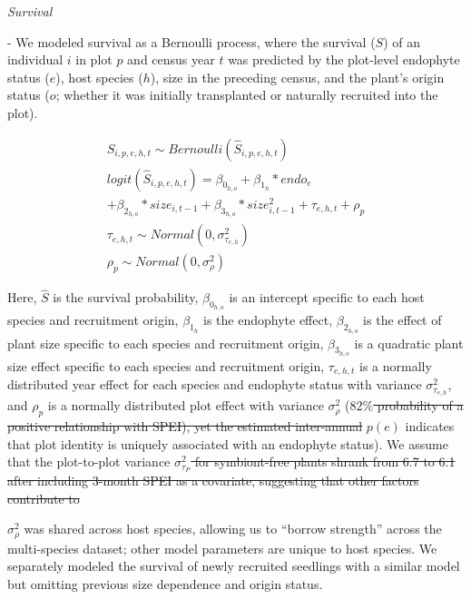 \documentclass[lineno,sn-nature]{sn-jnl}%
\providecommand{\DIFadd}[1]{{\protect\color{blue}#1}} %
\providecommand{\DIFdel}[1]{{\protect\color{red}\protect\scriptsize\sout{#1}}}
\providecommand{\DIFadd}[1]{{\protect\color{blue}\uwave{#1}}} %
\providecommand{\DIFdel}[1]{{\protect\color{red}\sout{#1}}}                      %
\providecommand{\DIFaddbegin}{} %
\providecommand{\DIFaddend}{} %
\providecommand{\DIFdelbegin}{} %
\providecommand{\DIFdelend}{} %
\newcommand{\DIFscaledelfig}{0.5}
\newlength{\DIFdelgraphicswidth} %
\newlength{\DIFdelgraphicsheight} %
\newcommand{\DIFaddincludegraphics}[2][]{{\color{blue}\fbox{\DIFOincludegraphics[#1]{#2}}}} %
\newcommand{\DIFdelincludegraphics}[2][]{%
\sbox{\DIFdelgraphicsbox}{\DIFOincludegraphics[#1]{#2}}%
\settoboxwidth{\DIFdelgraphicswidth}{\DIFdelgraphicsbox} %
\settoboxtotalheight{\DIFdelgraphicsheight}{\DIFdelgraphicsbox} %
\scalebox{\DIFscaledelfig}{%
\parbox[b]{\DIFdelgraphicswidth}{\usebox{\DIFdelgraphicsbox}\\[-\baselineskip] \rule{\DIFdelgraphicswidth}{0em}}\llap{\resizebox{\DIFdelgraphicswidth}{\DIFdelgraphicsheight}{%
\setlength{\unitlength}{\DIFdelgraphicswidth}%
\begin{picture}(1,1)%
\thicklines\linethickness{2pt} %
{\color[rgb]{1,0,0}\put(0,0){\framebox(1,1){}}}%
{\color[rgb]{1,0,0}\put(0,0){\line( 1,1){1}}}%
{\color[rgb]{1,0,0}\put(0,1){\line(1,-1){1}}}%
\end{picture}%
}\hspace*{3pt}}} %
} %
\DeclareRobustCommand{\DIFaddbegin}{\DIFOaddbegin \let\includegraphics\DIFaddincludegraphics} %
\DeclareRobustCommand{\DIFaddend}{\DIFOaddend \let\includegraphics\DIFOincludegraphics} %
\DeclareRobustCommand{\DIFdelbegin}{\DIFOdelbegin \let\includegraphics\DIFdelincludegraphics} %
\DeclareRobustCommand{\DIFdelend}{\DIFOaddend \let\includegraphics\DIFOincludegraphics} %
\begin{document}
\begin{appendices}
{}

\emph{\DIFadd{Survival}} \DIFadd{- We modeled survival as a Bernoulli process, where the survival ($S$) of an individual $i$ in plot $p$ and census year $t$ was predicted by the plot-level endophyte status ($e$), host species ($h$), size in the preceding census, and the plant's origin status ($o$; whether it was initially transplanted or naturally recruited into the plot).

}

\begin{subequations}
	\label{eq:survival}
	\begin{align}
		S_{i,p,e,h,t} \sim Bernoulli(\hat{S}_{i,p,e,h,t})\\
		logit(\hat{S}_{i,p,e,h,t}) = \beta_{0_{h,o}} + \beta_{1_{h}}*endo_{e}\\
		 + \beta_{2_{h,o}}*size_{i,t-1} +\beta_{3_{h,o}}*size^2_{i,t-1} + \tau_{e,h,t} + \rho_{p}\\
		\tau_{e,h,t} \sim Normal(0,\sigma^2_{\tau_{e,h}})\\
		\rho_{p} \sim Normal(0,\sigma^2_{\rho})
	\end{align}
\end{subequations}

\DIFadd{Here, $\hat{S}$ is the survival probability, $\beta_{0_{h,o}}$ is an intercept specific to each host species and recruitment origin, $\beta_{1_{h}}$ is the endophyte effect, $\beta_{2_{h,o}}$ is the effect of plant size specific to each species and recruitment origin, $\beta_{3_{h,o}}$ is a quadratic plant size effect specific to each species and recruitment origin, $\tau_{e,h,t}$ is a normally distributed year effect for each species and endophyte status with variance $\sigma^2_{\tau_{e,h}}$, and $\rho_{p}$ is a normally distributed plot effect with variance $\sigma^2_{\rho}$ }\DIFaddend (\DIFdelbegin \DIFdel{$82\%$ probability of a positive relationship with SPEI), yet the estimated inter-annual }\DIFdelend \DIFaddbegin \DIFadd{$p(e)$ indicates that plot identity is uniquely associated with an endophyte status).
We assume that the plot-to-plot }\DIFaddend variance \DIFdelbegin \DIFdel{$\sigma^2_{\tau_{P}}$ for symbiont-free plants shrank from 6.7 to 6.1 after including 3-month SPEI as a covariate, suggesting that other factors contribute to }\DIFdelend \DIFaddbegin \DIFadd{$\sigma^2_{\rho}$ was shared across host species, allowing us to ``borrow strength'' across the multi-species dataset; other model parameters are unique to host species. 
We separately modeled the survival of newly recruited seedlings with a similar model but omitting previous size dependence and origin status. 

}
\end{appendices}
\end{document}
